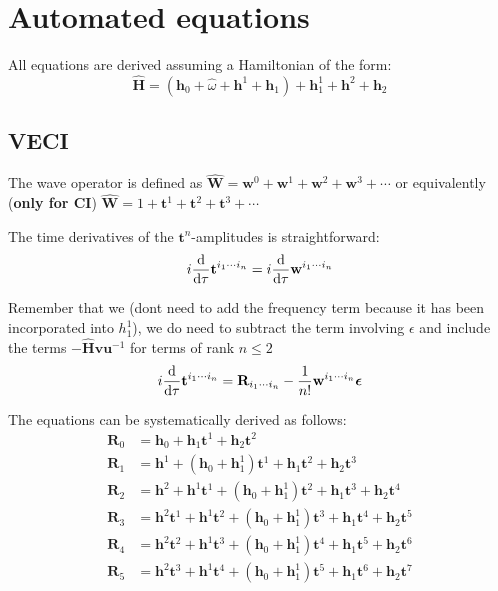 \documentclass{article}
\newcommand{\bh}{\textbf{h}}
\newcommand{\bt}{\textbf{t}}
\newcommand{\bw}{\textbf{w}}
\begin{document}
\section{Automated equations}
All equations are derived assuming a Hamiltonian of the form:
\begin{equation}
    \hat{\textbf{H}} = (\bh_0 + \hat{\omega} + \bh^1 + \bh_1 ) + \bh_1^1 + \bh^2 + \bh_2
\end{equation}

\subsection{VECI}
The wave operator is defined as $\hat{\textbf{W}} = \textbf{w}^0 + \textbf{w}^1 + \textbf{w}^2 + \textbf{w}^3 + \cdots$ or equivalently (\textbf{only for CI}) $\hat{\textbf{W}} = 1 + \textbf{t}^1 + \textbf{t}^2 + \textbf{t}^3 + \cdots$

The time derivatives of the $\bt^{n}$-amplitudes is straightforward:
\begin{equation}
    i\dv{\tau}\bt^{i_1 \cdots i_n} = i\dv{\tau}\bw^{i_1 \cdots i_n}
\end{equation}

Remember that we (dont need to add the frequency term because it has been incorporated into $h^1_1$), we do need to subtract the term involving $\epsilon$ and include the terms $-\hat{\textbf{H}}\textbf{v}\textbf{u}^{-1}$ for terms of rank $n \leq 2$
\begin{equation}
    i\dv{\tau}\bt^{i_1 \cdots i_n} = \textbf{R}_{i_1 \cdots i_n} - \dfrac{1}{n!}\bw^{i_1 \cdots i_n}\boldsymbol\epsilon
\end{equation}


The equations can be systematically derived as follows:
\begin{align}
\textbf{R}_{0} &= \bh_0 + \bh_1\bt^{1} + \bh_2\bt^{2} \\
\textbf{R}_{1} &= \bh^1 + (\bh_0 + \bh^1_1)\bt^{1} + \bh_1\bt^{2} + \bh_2\bt^{3} \\
\textbf{R}_{2} &= \bh^2 + \bh^1\bt^{1} + (\bh_0 + \bh^1_1)\bt^{2} + \bh_1\bt^{3} + \bh_2\bt^{4} \\
\textbf{R}_{3} &= \bh^2\bt^{1} + \bh^1\bt^{2} + (\bh_0 + \bh^1_1)\bt^{3} + \bh_1\bt^{4} + \bh_2\bt^{5} \\
\textbf{R}_{4} &= \bh^2\bt^{2} + \bh^1\bt^{3} + (\bh_0 + \bh^1_1)\bt^{4} + \bh_1\bt^{5} + \bh_2\bt^{6} \\
\textbf{R}_{5} &= \bh^2\bt^{3} + \bh^1\bt^{4} + (\bh_0 + \bh^1_1)\bt^{5} + \bh_1\bt^{6} + \bh_2\bt^{7}
\end{align}
\end{document}
